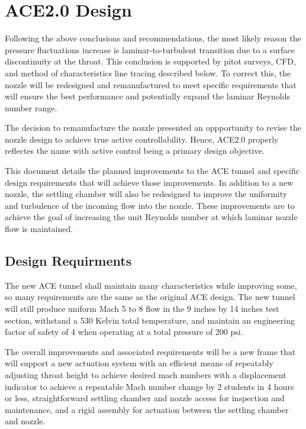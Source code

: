 \section{ACE2.0 Design}

Following the above conclusions and recommendations, the most likely reason the pressure fluctuations increase is laminar-to-turbulent transition due to a surface discontinuity at the throat. This conclusion is supported by pitot surveys, CFD, and method of characteristics line tracing described below. To correct this, the nozzle will be redesigned and remanufactured to meet specific requirements that will ensure the best performance and potentially expand the laminar Reynolds number range.

The decision to remanufacture the nozzle presented an oppportunity to revise the nozzle design to achieve true active controllability. Hence, ACE2.0 properly reflectes the name with active control being a primary design objective.

This document details the planned improvements to the ACE tunnel and specific design requirements that will achieve those improvements. In addition to a new nozzle, the settling chamber will also be redesigned to improve the uniformity and turbulence of the incoming flow into the nozzle. These improvements are to achieve the goal of increasing the unit Reynolds number at which laminar nozzle flow is maintained.

\subsection{Design Requirments}

The new ACE tunnel shall maintain many characteristics while improving some, so many requirements are the same as the original ACE design. The new tunnel will still produce uniform Mach 5 to 8 flow in the 9 inches by 14 inches test section, withstand a 530 Kelvin total temperature, and maintain an engineering factor of safety of 4 when operating at a total pressure of 200 psi.

The overall improvements and associated requirements will be a new frame that will support a new actuation system with an efficient means of repeatably adjusting throat height to achieve desired mach numbers with a displacement indicator to achieve a repeatable Mach number change by 2 students in 4 hours or less, straightforward settling chamber and nozzle access for inspection and maintenance, and a rigid assembly for actuation between the settling chamber and nozzle.

